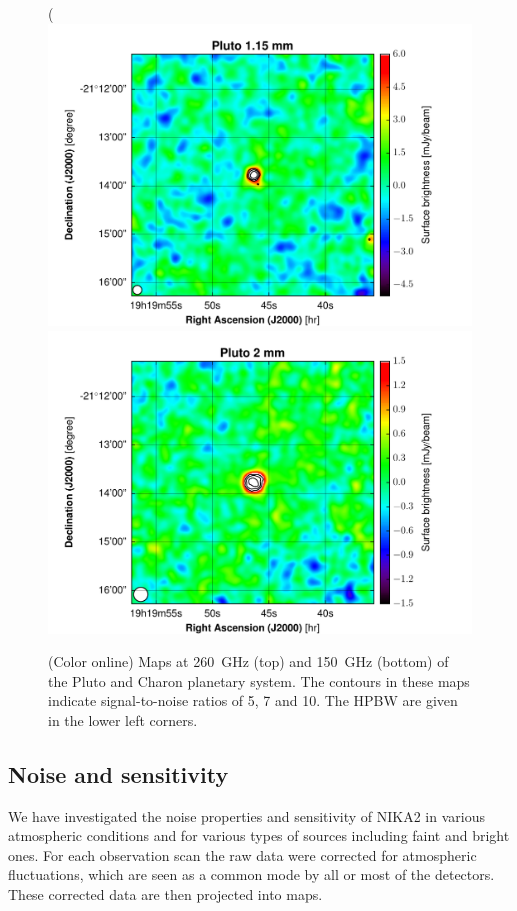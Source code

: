 \documentclass[]{aa} %
\begin{document}
\begin{figure}[h]
   \centering(
        \includegraphics[width=.75\linewidth]{Pluto_1mm_map_snrcont.pdf}
    \includegraphics[width=.75\linewidth]{Pluto_2mm_map_snrcont.pdf}
      \caption{(Color online) Maps at 260~GHz (top) and 150~GHz (bottom) of the Pluto and Charon planetary system. The contours in these maps indicate signal-to-noise ratios of 5, 7 and 10. The HPBW are given in the lower left corners.
         \label{fig_compact_sources2}}
\end{figure}




\subsection{Noise and sensitivity}
\label{Noise and sensitivity}

We have investigated the noise properties and sensitivity of NIKA2 in various atmospheric conditions and for various types of sources including faint and bright ones. For each observation scan the raw data were corrected for atmospheric fluctuations, which are seen as a common mode by all or most of the detectors. These corrected data are then projected into maps.
\end{document}
